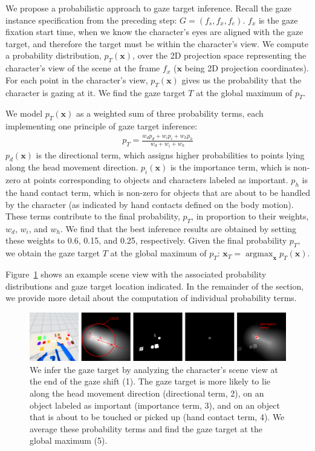 We propose a probabilistic approach to gaze target inference. Recall the gaze instance specification from the preceding step: $G = (f_s, f_x, f_e)$. $f_x$ is the gaze fixation start time, when we know the character's eyes are aligned with the gaze target, and therefore the target must be within the character's view. We compute a probability distribution, $p_T(\mathbf{x})$, over the 2D projection space representing the character's view of the scene at the frame $f_x$ ($\mathbf{x}$ being 2D projection coordinates). For each point in the character's view, $p_T(\mathbf{x})$ gives us the probability that the character is gazing at it. We find the gaze target $T$ at the global maximum of $p_T$.

We model $p_T(\mathbf{x})$ as a weighted sum of three probability terms, each implementing one principle of gaze target inference:
%
\begin{align} \label{eq:GazeTargetGlobalProbability}
p_T = \frac{w_d p_d + w_i p_i + w_h p_h}{w_d + w_i + w_h}
\end{align}
%
$p_d(\mathbf{x})$ is the directional term, which assigns higher probabilities to points lying along the head movement direction. $p_i(\mathbf{x})$ is the importance term, which is non-zero at points corresponding to objects and characters labeled as important. $p_h$ is the hand contact term, which is non-zero for objects that are about to be handled by the character (as indicated by hand contacts defined on the body motion). These terms contribute to the final probability, $p_T$, in proportion to their weights, $w_d$, $w_i$, and $w_h$. We find that the best inference results are obtained by setting these weights to 0.6, 0.15, and 0.25, respectively. Given the final probability $p_T$, we obtain the gaze target $T$ at the global maximum of $p_T$: $\mathbf{x}_T = \mathop{argmax}_{\mathbf{x}} p_T(\mathbf{x})$.

Figure~\ref{fig:GazeTargetInference} shows an example scene view with the associated probability distributions and gaze target location indicated. In the remainder of the section, we provide more detail about the computation of individual probability terms.

\begin{figure}
\centering
\includegraphics[width=1\textwidth]{gazeauthoring/Figures/GazeTargetInference.pdf}
\caption{We infer the gaze target by analyzing the character's scene view at the end of the gaze shift (1). The gaze target is more likely to lie along the head movement direction (directional term, 2), on an object labeled as important (importance term, 3), and on an object that is about to be touched or picked up (hand contact term, 4). We average these probability terms and find the gaze target at the global maximum (5).}
\label{fig:GazeTargetInference}
\end{figure}


